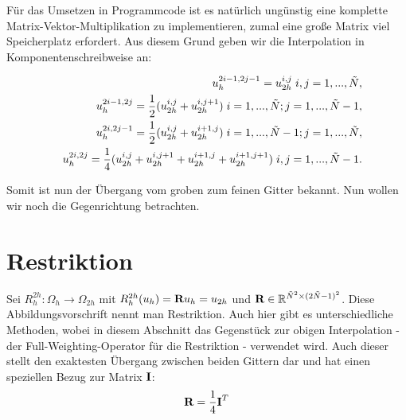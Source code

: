 \label{img.Prolongation}

Für das Umsetzen in Programmcode ist es natürlich ungünstig eine komplette Matrix-Vektor-Multiplikation zu implementieren, zumal eine große Matrix viel Speicherplatz erfordert. Aus diesem Grund geben wir die Interpolation in Komponentenschreibweise an:

\begin{eqnarray}
&&u_{h}^{2i-1,2j-1} = u_{2h}^{i,j} \hspace{0.1cm} i,j = 1,...,\tilde N, \\
&&u_{h}^{2i-1,2j} = \frac{1}{2} (u_{2h}^{i,j} + u_{2h}^{i,j+1}) \hspace{0.1cm} i = 1,...,\tilde N; j = 1,...,\tilde N - 1, \\
&&u_{h}^{2i,2j-1} = \frac{1}{2} (u_{2h}^{i,j} + u_{2h}^{i+1,j}) \hspace{0.1cm} i = 1,...,\tilde N - 1; j = 1,...,\tilde N, \\
&&u_{h}^{2i,2j} = \frac{1}{4} (u_{2h}^{i,j} + u_{2h}^{i,j+1} + u_{2h}^{i+1,j} + u_{2h}^{i+1,j+1}) \hspace{0.1cm} i,j = 1,...,\tilde N - 1.
\end{eqnarray}

Somit ist nun der Übergang vom groben zum feinen Gitter bekannt. Nun wollen wir noch die Gegenrichtung betrachten.

\section{Restriktion}

Sei $R_{h}^{2h}: \Omega_{h} \longrightarrow \Omega_{2h}$ mit $R_{h}^{2h}(u_{h}) = {\textbf{R}}u_{h} = u_{2h}$ und ${\textbf{R}} \in \mathbb{R}^{\tilde N^{2} \times (2 \tilde N - 1)^{2}}$. Diese Abbildungsvorschrift nennt man Restriktion. Auch hier gibt es unterschiedliche Methoden, wobei in diesem Abschnitt das Gegenstück zur obigen Interpolation - der Full-Weighting-Operator für die Restriktion - verwendet wird. Auch dieser stellt den exaktesten Übergang zwischen beiden Gittern dar und hat einen speziellen Bezug zur Matrix ${\textbf{I}}$:
\begin{equation}
{\textbf{R}} = \frac {1} {4} {\textbf{I}}^{T}
\end{equation}

